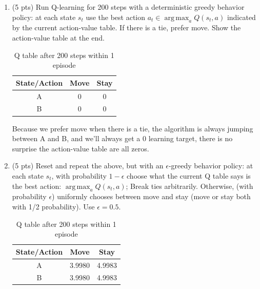 \documentclass[a4paper]{article}
\theoremstyle{definition}
\DeclareMathOperator*{\argmax}{arg\,max}
\newenvironment{soln}{
    \leavevmode\color{blue}\ignorespaces
}{}
\begin{document}
\begin{enumerate}
	\item (5 pts) Run Q-learning for 200 steps with a deterministic greedy behavior policy: at each state $s_t$ use the best action $a_t \in \argmax_a Q(s_t,a)$ indicated by the current action-value table. If there is a tie, prefer move. Show the action-value table at the end.

	      \begin{soln}
		      \begin{table}[!h]
			      \begin{center}
				      \begin{tabular}{ccc}
					      State/Action & Move & Stay \\\hline
					      A            & 0    & 0    \\
					      B            & 0    & 0
				      \end{tabular}
				      \caption*{Q table after 200 steps within 1 episode}
			      \end{center}
		      \end{table}

		      Because we prefer move when there is a tie, the algorithm is always jumping between A and B, and we'll always get a 0 learning target, there is no surprise the action-value table are all zeros.
	      \end{soln}

	\item (5 pts) Reset and repeat the above, but with an $\epsilon$-greedy behavior policy: at each state $s_t$, with probability $1-\epsilon$ choose what the current Q table says is the best action: $\argmax_a Q(s_t,a)$; Break ties arbitrarily. Otherwise, (with probability $\epsilon$) uniformly chooses between move and stay (move or stay both with 1/2 probability). Use $\epsilon=0.5$.

	      \begin{soln}
		      \begin{table}[!h]
			      \begin{center}
				      \begin{tabular}{ccc}
					      State/Action & Move   & Stay   \\\hline
					      A            & 3.9980 & 4.9983 \\
					      B            & 3.9980 & 4.9983
				      \end{tabular}
				      \caption*{Q table after 200 steps within 1 episode}
			      \end{center}
		      \end{table}
	      \end{soln}


\end{enumerate}
\end{document}
